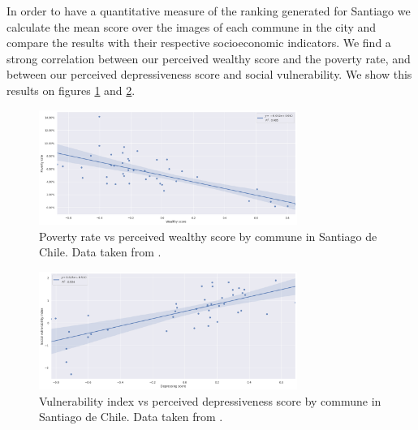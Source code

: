 In order to have a quantitative measure of the ranking generated for Santiago we calculate the mean score over
the images of each commune in the city and compare the results with their respective
socioeconomic indicators. We find a strong correlation between our perceived wealthy score
and the poverty rate, and between our perceived depressiveness score and social vulnerability.
We show this results on figures \ref{fig:poverty} and \ref{fig:vulnerability}.

\begin{figure}[ht]
	\begin{center}
	\includegraphics[width=0.75\textwidth]{./figures/poverty_rate.png}
	\caption[Poverty rate vs perceived wealthy score]{
		Poverty rate vs perceived wealthy score by commune in Santiago de Chile.
		Data taken from .
    }
	\label{fig:poverty}
	\end{center}
\end{figure}

\begin{figure}[ht]
	\begin{center}
	\includegraphics[width=0.75\textwidth]{./figures/vulnerability_index.png}
	\caption[Vulnerability index vs perceived depressiveness score]{
		Vulnerability index vs perceived depressiveness score by commune in Santiago de Chile.
		Data taken from .
    }
	\label{fig:vulnerability}
	\end{center}
\end{figure}